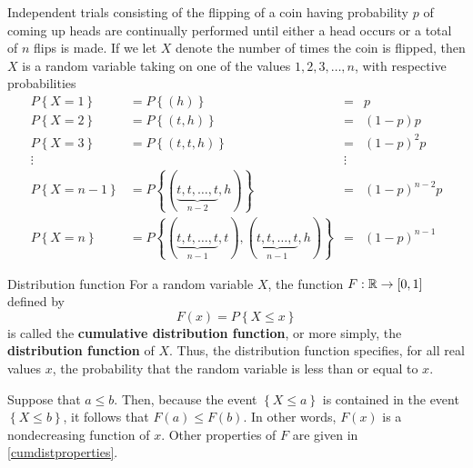 \begin{changebar}
    \begin{example}
        Independent trials consisting of the flipping of a coin having probability $p$ of coming up heads are continually performed until either a head occurs or a total of $n$ flips is made. If we let $X$ denote the number of times the coin is flipped, then $X$ is a random variable taking on one of the values $1, 2, 3, \dots, n$, with respective probabilities \[
            \begin{aligned}
                P\left\{ X = 1 \right\} &= P\left\{ (h) \right\} &=& p \\
                P\left\{ X = 2 \right\} &= P\left\{ (t, h) \right\} &=& (1-p)p \\
                P\left\{ X = 3 \right\} &= P\left\{ (t, t, h) \right\} &=& (1-p)^2p \\
                \vdots && \vdots & \\
                P\left\{ X = n - 1 \right\} &= P\left\{ (\underbrace{t, t, \dots, t}_{n - 2}, h) \right\} &=& (1-p)^{n-2}p \\
                P\left\{ X = n \right\} &= P\left\{ (\underbrace{t, t, \dots, t}_{n - 1}, t), (\underbrace{t, t, \dots, t}_{n - 1}, h) \right\} &=& (1-p)^{n-1}
            \end{aligned}    
        \]
    \end{example}    
\end{changebar}
\begin{bdef}{Distribution function}\label{distributionfunction}
    For a random variable $X$, the function $F: \mathbb{R} \to [0, 1]$ defined by \[
        F(x) = P\left\{ X \leq x \right\}
    \] is called the \textbf{cumulative distribution function}, or more simply, the \textbf{distribution function} of $X$. Thus, the distribution function specifies, for all real values $x$, the probability that the random variable is less than or equal to $x$.
    
    Suppose that $a \leq b$. Then, because the event $\left\{ X \leq a \right\}$ is contained in the event $\left\{ X \leq b \right\}$, it follows that $F(a) \leq F(b)$. In other words, $F(x)$ is a nondecreasing function of $x$. Other properties of $F$ are given in \autoref{cumdistproperties}.
\end{bdef}
\pagebreak
